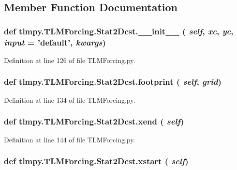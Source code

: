 \subsection{Member Function Documentation}
\hypertarget{classtlmpy_1_1TLMForcing_1_1Stat2Dcst_a273d295ee47f5f2090402c1ac7cd9ec5}{
\subsubsection[{\_\-\_\-init\_\-\_\-}]{\setlength{\rightskip}{0pt plus 5cm}def tlmpy.TLMForcing.Stat2Dcst.\_\-\_\-init\_\-\_\- ( {\em self}, \/   {\em xc}, \/   {\em yc}, \/   {\em input} = {\ttfamily 'default'}, \/   {\em kwargs})}}
\label{classtlmpy_1_1TLMForcing_1_1Stat2Dcst_a273d295ee47f5f2090402c1ac7cd9ec5}


Definition at line 126 of file TLMForcing.py.\hypertarget{classtlmpy_1_1TLMForcing_1_1Stat2Dcst_a7604e7afb1067d70b4bcc05f4f1dbda3}{
\subsubsection[{footprint}]{\setlength{\rightskip}{0pt plus 5cm}def tlmpy.TLMForcing.Stat2Dcst.footprint ( {\em self}, \/   {\em grid})}}
\label{classtlmpy_1_1TLMForcing_1_1Stat2Dcst_a7604e7afb1067d70b4bcc05f4f1dbda3}


Definition at line 134 of file TLMForcing.py.\hypertarget{classtlmpy_1_1TLMForcing_1_1Stat2Dcst_af2f3a1b590f6a99c9c59924d14e69724}{
\subsubsection[{xend}]{\setlength{\rightskip}{0pt plus 5cm}def tlmpy.TLMForcing.Stat2Dcst.xend ( {\em self})}}
\label{classtlmpy_1_1TLMForcing_1_1Stat2Dcst_af2f3a1b590f6a99c9c59924d14e69724}


Definition at line 144 of file TLMForcing.py.\hypertarget{classtlmpy_1_1TLMForcing_1_1Stat2Dcst_ad923dfa4449916c49fe99e5159b817ca}{
\subsubsection[{xstart}]{\setlength{\rightskip}{0pt plus 5cm}def tlmpy.TLMForcing.Stat2Dcst.xstart ( {\em self})}}
\label{classtlmpy_1_1TLMForcing_1_1Stat2Dcst_ad923dfa4449916c49fe99e5159b817ca}


